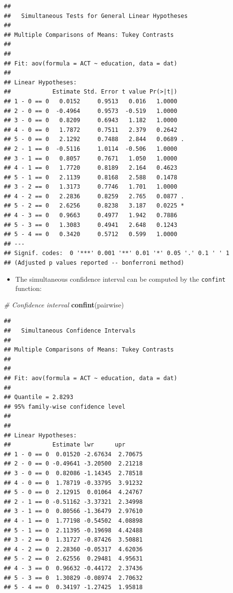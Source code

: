 \documentclass[
]{book}
\newenvironment{Shaded}{\begin{snugshade}}{\end{snugshade}}
\newcommand{\CommentTok}[1]{\textcolor[rgb]{0.56,0.35,0.01}{\textit{#1}}}
\newcommand{\FunctionTok}[1]{\textcolor[rgb]{0.13,0.29,0.53}{\textbf{#1}}}
\newcommand{\NormalTok}[1]{#1}
\providecommand{\tightlist}{%
  \setlength{\itemsep}{0pt}\setlength{\parskip}{0pt}}
\begin{document}
\begin{verbatim}
## 
##   Simultaneous Tests for General Linear Hypotheses
## 
## Multiple Comparisons of Means: Tukey Contrasts
## 
## 
## Fit: aov(formula = ACT ~ education, data = dat)
## 
## Linear Hypotheses:
##            Estimate Std. Error t value Pr(>|t|)  
## 1 - 0 == 0   0.0152     0.9513   0.016   1.0000  
## 2 - 0 == 0  -0.4964     0.9573  -0.519   1.0000  
## 3 - 0 == 0   0.8209     0.6943   1.182   1.0000  
## 4 - 0 == 0   1.7872     0.7511   2.379   0.2642  
## 5 - 0 == 0   2.1292     0.7488   2.844   0.0689 .
## 2 - 1 == 0  -0.5116     1.0114  -0.506   1.0000  
## 3 - 1 == 0   0.8057     0.7671   1.050   1.0000  
## 4 - 1 == 0   1.7720     0.8189   2.164   0.4623  
## 5 - 1 == 0   2.1139     0.8168   2.588   0.1478  
## 3 - 2 == 0   1.3173     0.7746   1.701   1.0000  
## 4 - 2 == 0   2.2836     0.8259   2.765   0.0877 .
## 5 - 2 == 0   2.6256     0.8238   3.187   0.0225 *
## 4 - 3 == 0   0.9663     0.4977   1.942   0.7886  
## 5 - 3 == 0   1.3083     0.4941   2.648   0.1243  
## 5 - 4 == 0   0.3420     0.5712   0.599   1.0000  
## ---
## Signif. codes:  0 '***' 0.001 '**' 0.01 '*' 0.05 '.' 0.1 ' ' 1
## (Adjusted p values reported -- bonferroni method)
\end{verbatim}

\begin{itemize}
\tightlist
\item
  The simultaneous confidence interval can be computed by the \texttt{confint} function:
\end{itemize}

\begin{Shaded}
\begin{Highlighting}[]
\CommentTok{\# Confidence interval}
\FunctionTok{confint}\NormalTok{(pairwise)}
\end{Highlighting}
\end{Shaded}

\begin{verbatim}
## 
##   Simultaneous Confidence Intervals
## 
## Multiple Comparisons of Means: Tukey Contrasts
## 
## 
## Fit: aov(formula = ACT ~ education, data = dat)
## 
## Quantile = 2.8293
## 95% family-wise confidence level
##  
## 
## Linear Hypotheses:
##            Estimate lwr      upr     
## 1 - 0 == 0  0.01520 -2.67634  2.70675
## 2 - 0 == 0 -0.49641 -3.20500  2.21218
## 3 - 0 == 0  0.82086 -1.14345  2.78518
## 4 - 0 == 0  1.78719 -0.33795  3.91232
## 5 - 0 == 0  2.12915  0.01064  4.24767
## 2 - 1 == 0 -0.51162 -3.37321  2.34998
## 3 - 1 == 0  0.80566 -1.36479  2.97610
## 4 - 1 == 0  1.77198 -0.54502  4.08898
## 5 - 1 == 0  2.11395 -0.19698  4.42488
## 3 - 2 == 0  1.31727 -0.87426  3.50881
## 4 - 2 == 0  2.28360 -0.05317  4.62036
## 5 - 2 == 0  2.62556  0.29481  4.95631
## 4 - 3 == 0  0.96632 -0.44172  2.37436
## 5 - 3 == 0  1.30829 -0.08974  2.70632
## 5 - 4 == 0  0.34197 -1.27425  1.95818
\end{verbatim}
\end{document}
